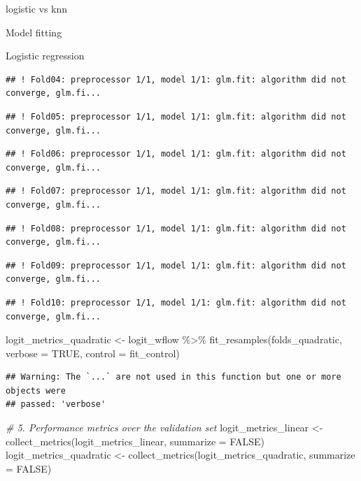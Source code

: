 \documentclass[
  ignorenonframetext,
]{article}
\newenvironment{Shaded}{\begin{snugshade}}{\end{snugshade}}
\newcommand{\AttributeTok}[1]{\textcolor[rgb]{0.77,0.63,0.00}{#1}}
\newcommand{\CommentTok}[1]{\textcolor[rgb]{0.56,0.35,0.01}{\textit{#1}}}
\newcommand{\ConstantTok}[1]{\textcolor[rgb]{0.00,0.00,0.00}{#1}}
\newcommand{\FunctionTok}[1]{\textcolor[rgb]{0.00,0.00,0.00}{#1}}
\newcommand{\NormalTok}[1]{#1}
\newcommand{\OtherTok}[1]{\textcolor[rgb]{0.56,0.35,0.01}{#1}}
\newcommand{\SpecialCharTok}[1]{\textcolor[rgb]{0.00,0.00,0.00}{#1}}
\begin{document}
\begin{frame}[fragile]{logistic vs knn}
\begin{block}{Model fitting}
\begin{block}{Logistic regression}
\begin{verbatim}
## ! Fold04: preprocessor 1/1, model 1/1: glm.fit: algorithm did not converge, glm.fi...
\end{verbatim}

\begin{verbatim}
## ! Fold05: preprocessor 1/1, model 1/1: glm.fit: algorithm did not converge, glm.fi...
\end{verbatim}

\begin{verbatim}
## ! Fold06: preprocessor 1/1, model 1/1: glm.fit: algorithm did not converge, glm.fi...
\end{verbatim}

\begin{verbatim}
## ! Fold07: preprocessor 1/1, model 1/1: glm.fit: algorithm did not converge, glm.fi...
\end{verbatim}

\begin{verbatim}
## ! Fold08: preprocessor 1/1, model 1/1: glm.fit: algorithm did not converge, glm.fi...
\end{verbatim}

\begin{verbatim}
## ! Fold09: preprocessor 1/1, model 1/1: glm.fit: algorithm did not converge, glm.fi...
\end{verbatim}

\begin{verbatim}
## ! Fold10: preprocessor 1/1, model 1/1: glm.fit: algorithm did not converge, glm.fi...
\end{verbatim}

\begin{Shaded}
\begin{Highlighting}[]
\NormalTok{logit\_metrics\_quadratic }\OtherTok{\textless{}{-}} 
\NormalTok{  logit\_wflow }\SpecialCharTok{\%\textgreater{}\%} 
  \FunctionTok{fit\_resamples}\NormalTok{(folds\_quadratic, }\AttributeTok{verbose =} \ConstantTok{TRUE}\NormalTok{, }\AttributeTok{control =}\NormalTok{ fit\_control)}
\end{Highlighting}
\end{Shaded}

\begin{verbatim}
## Warning: The `...` are not used in this function but one or more objects were
## passed: 'verbose'
\end{verbatim}

\begin{Shaded}
\begin{Highlighting}[]
\CommentTok{\# 5. Performance metrics over the validation set}
\NormalTok{logit\_metrics\_linear }\OtherTok{\textless{}{-}} \FunctionTok{collect\_metrics}\NormalTok{(logit\_metrics\_linear, }\AttributeTok{summarize =} \ConstantTok{FALSE}\NormalTok{)}
\NormalTok{logit\_metrics\_quadratic }\OtherTok{\textless{}{-}} \FunctionTok{collect\_metrics}\NormalTok{(logit\_metrics\_quadratic, }\AttributeTok{summarize =} \ConstantTok{FALSE}\NormalTok{)}



\end{Highlighting}
\end{Shaded}
\end{block}
\end{block}
\end{frame}
\end{document}
